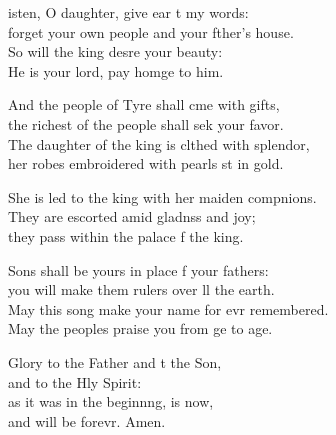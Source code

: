 \settowidth{\versewidth}{The daughter of the king is clothed with splendor, *}
\begin{psalmverse}%
  \begin{patverse}
isten, O daughter, give ear t my words:\Med\\
forget your own people and your fther’s house.\\
So will the king des\pointup{\i}re your beauty:\Med\\
He is your lord, pay homge to him.

And the people of Tyre shall cme with gifts,\Med\\
the richest of the people shall sek your favor.\\
The daughter of the king is clthed with splendor,\Med\\
her robes embroidered with pearls st in gold.

She is led to the king with her maiden compnions.\Flex\\
They are escorted amid gladnss and joy;\Med\\
they pass within the palace f the king.

Sons shall be yours in place f your fathers:\Med\\
you will make them rulers over ll the earth.\\
May this song make your name for evr remembered.\Med\\
May the peoples praise you from ge to age.

Glory to the Father and t the Son,\Med\\
and to the Hly Spirit:\\
as it was in the beginn\pointup{\i}ng, is now,\Med\\
and will be forevr. Amen. 
  \end{patverse}
\end{psalmverse}
